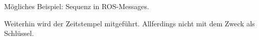 








Mögliches Beispiel: Sequenz in ROS-Messages. 

Weiterhin wird der Zeitstempel mitgeführt. Allferdings nicht mit dem Zweck als Schlüssel.





